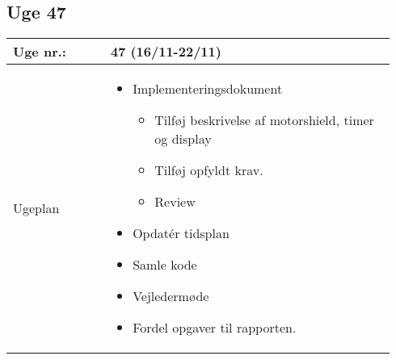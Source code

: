 	\subsection{Uge 47}
	\begin{longtable}{|p{0.24\linewidth}|p{0.7\linewidth}|}
		\hline
		Uge nr.: & 47 (16/11-22/11)\\ \hline
		Ugeplan & 
		\begin{itemize}
			\item Implementeringsdokument
			\begin{itemize}
				\item Tilføj beskrivelse af motorshield, timer og display
				\item Tilføj opfyldt krav. 
				\item Review
			\end{itemize}
			\item Opdatér tidsplan
			\item Samle kode 
			\item Vejledermøde
			\item Fordel opgaver til rapporten. 
		\end{itemize}
		

\end{longtable}
